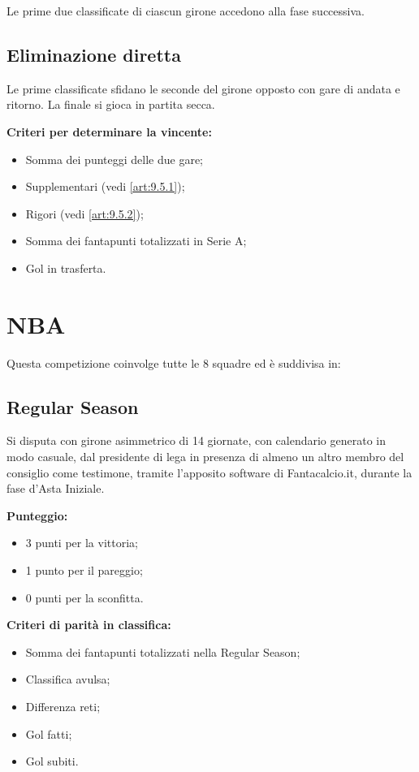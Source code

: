 Le prime due classificate di ciascun girone accedono alla fase successiva.

\subsection{Eliminazione diretta}
\label{art:9.2.2}

Le prime classificate sfidano le seconde del girone opposto con gare di andata e ritorno. La finale si gioca in partita secca.

\textbf{Criteri per determinare la vincente:}
\begin{itemize}
\item Somma dei punteggi delle due gare;
\item Supplementari (vedi \ref{art:9.5.1});
\item Rigori (vedi \ref{art:9.5.2});
\item Somma dei fantapunti totalizzati in Serie A;
\item Gol in trasferta.
\end{itemize}

\section{NBA}
\label{art:9.3}

Questa competizione coinvolge tutte le 8 squadre ed è suddivisa in:

\subsection{Regular Season}
\label{art:9.3.1}

Si disputa con girone asimmetrico di 14 giornate, con calendario generato in modo casuale, dal presidente di lega in presenza di almeno un altro membro del consiglio come testimone, tramite l'apposito software di Fantacalcio.it, durante la fase d'Asta Iniziale.

\textbf{Punteggio:}
\begin{itemize}
\item 3 punti per la vittoria;
\item 1 punto per il pareggio;
\item 0 punti per la sconfitta.
\end{itemize}

\textbf{Criteri di parità in classifica:}
\begin{itemize}
\item Somma dei fantapunti totalizzati nella Regular Season;
\item Classifica avulsa;
\item Differenza reti;
\item Gol fatti;
\item Gol subiti.
\end{itemize}

